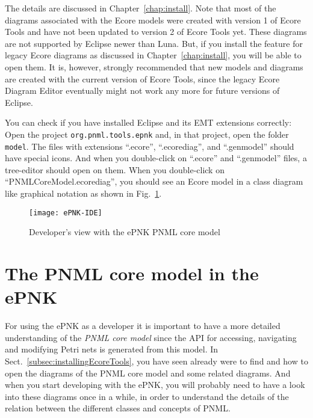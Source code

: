 The details are discussed in Chapter~\ref{chap:install}. Note that most of
the diagrams associated with the Ecore models were created with version 1 of
Ecore Tools and have not been updated to version 2 of Ecore Tools yet. These
diagrams are not supported by Eclipse newer than Luna. But, if you install
the feature for legacy Ecore diagrams as discussed in Chapter~\ref{chap:install},
you will be able to open them. It is, however, strongly recommended that
new models and diagrams are created with the current version of Ecore Tools,
since the legacy Ecore Diagram Editor eventually might not work any more for
future versions of Eclipse. 

You can check if you have installed Eclipse and its EMT extensions correctly:
Open the project {\tt org.pnml.tools.epnk} and, in that project, open the folder
{\tt model}. The files with extensions ``.ecore'', ``.ecorediag'', and ``.genmodel''
should have special icons. And when you double-click on ``.ecore'' and
``.genmodel'' files, a tree-editor should open on them. When you double-click
on ``PNMLCoreModel.ecorediag'', you should see an Ecore model in a class diagram
like graphical notation as shown in Fig.~\ref{fig:ePNK-IDE}. 

\begin{figure}[hbt!!]
  \centerline{\texttt{[image: ePNK-IDE]}}
  \caption{Developer's view with the ePNK PNML core model}
  \label{fig:ePNK-IDE}
\end{figure}


\section{The PNML core model in the ePNK}
\label{sec:ePNK-PNMLCoreModel}

For using the ePNK as a developer it is important to have a more
detailed understanding of the \emph{PNML core model} since the API
for accessing, navigating and modifying Petri nets is generated
from this model.  In Sect.~\ref{subsec:installingEcoreTools}, you have seen
already were to find and how to open the diagrams of the PNML core model
and some related diagrams. And when you start developing with the
ePNK, you will probably need to have a look into these diagrams
once in a while, in order to understand the details of the relation
between the different classes and concepts of PNML. 

